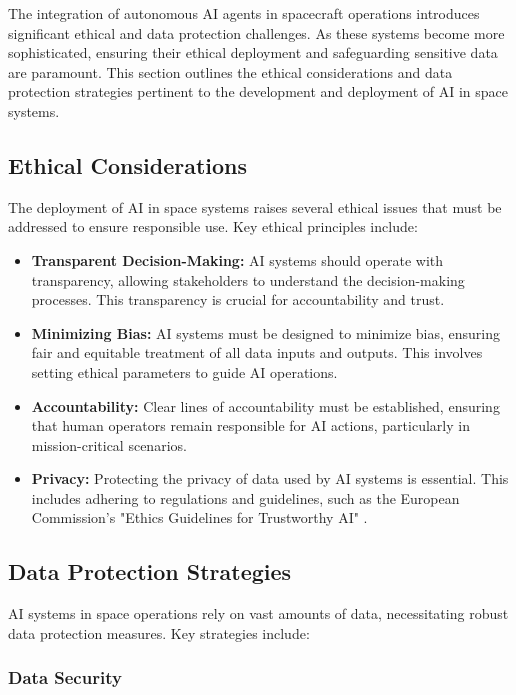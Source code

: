\documentclass[a4paper, 11pt]{article}
\begin{document}
The integration of autonomous AI agents in spacecraft operations introduces significant ethical and data protection challenges. As these systems become more sophisticated, ensuring their ethical deployment and safeguarding sensitive data are paramount. This section outlines the ethical considerations and data protection strategies pertinent to the development and deployment of AI in space systems.

\subsection{Ethical Considerations}

The deployment of AI in space systems raises several ethical issues that must be addressed to ensure responsible use. Key ethical principles include:

\begin{itemize}
    \item \textbf{Transparent Decision-Making:} AI systems should operate with transparency, allowing stakeholders to understand the decision-making processes. This transparency is crucial for accountability and trust.
    \item \textbf{Minimizing Bias:} AI systems must be designed to minimize bias, ensuring fair and equitable treatment of all data inputs and outputs. This involves setting ethical parameters to guide AI operations.
    \item \textbf{Accountability:} Clear lines of accountability must be established, ensuring that human operators remain responsible for AI actions, particularly in mission-critical scenarios.
    \item \textbf{Privacy:} Protecting the privacy of data used by AI systems is essential. This includes adhering to regulations and guidelines, such as the European Commission's "Ethics Guidelines for Trustworthy AI" \cite{ec_guidelines_2018}.
\end{itemize}

\subsection{Data Protection Strategies}

AI systems in space operations rely on vast amounts of data, necessitating robust data protection measures. Key strategies include:

\subsubsection{Data Security}
\end{document}
